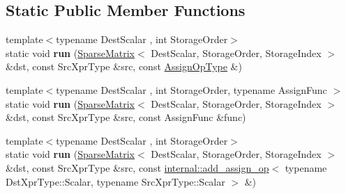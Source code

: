 \subsection*{Static Public Member Functions}
\begin{DoxyCompactItemize}
\item 
\mbox{\label{struct_eigen_1_1internal_1_1_assignment_3_01_dst_xpr_type_00_01_src_xpr_type_00_01_functor_00_017b35cf78061a31c93b838bddfa619fa3_a5c441b141f8149b0c8eb427486eb2cd1}} 
{\footnotesize template$<$typename Dest\+Scalar , int Storage\+Order$>$ }\\static void {\bfseries run} (\mbox{\hyperlink{class_eigen_1_1_sparse_matrix}{Sparse\+Matrix}}$<$ Dest\+Scalar, Storage\+Order, Storage\+Index $>$ \&dst, const Src\+Xpr\+Type \&src, const \mbox{\hyperlink{struct_eigen_1_1internal_1_1assign__op}{Assign\+Op\+Type}} \&)
\item 
\mbox{\label{struct_eigen_1_1internal_1_1_assignment_3_01_dst_xpr_type_00_01_src_xpr_type_00_01_functor_00_017b35cf78061a31c93b838bddfa619fa3_a77cd302a30c64789f91ba23771433091}} 
{\footnotesize template$<$typename Dest\+Scalar , int Storage\+Order, typename Assign\+Func $>$ }\\static void {\bfseries run} (\mbox{\hyperlink{class_eigen_1_1_sparse_matrix}{Sparse\+Matrix}}$<$ Dest\+Scalar, Storage\+Order, Storage\+Index $>$ \&dst, const Src\+Xpr\+Type \&src, const Assign\+Func \&func)
\item 
\mbox{\label{struct_eigen_1_1internal_1_1_assignment_3_01_dst_xpr_type_00_01_src_xpr_type_00_01_functor_00_017b35cf78061a31c93b838bddfa619fa3_a2f4176d30e11f2c578e3e81b399518cb}} 
{\footnotesize template$<$typename Dest\+Scalar , int Storage\+Order$>$ }\\static void {\bfseries run} (\mbox{\hyperlink{class_eigen_1_1_sparse_matrix}{Sparse\+Matrix}}$<$ Dest\+Scalar, Storage\+Order, Storage\+Index $>$ \&dst, const Src\+Xpr\+Type \&src, const \mbox{\hyperlink{struct_eigen_1_1internal_1_1add__assign__op}{internal\+::add\+\_\+assign\+\_\+op}}$<$ typename Dst\+Xpr\+Type\+::\+Scalar, typename Src\+Xpr\+Type\+::\+Scalar $>$ \&)

\end{DoxyCompactItemize}
